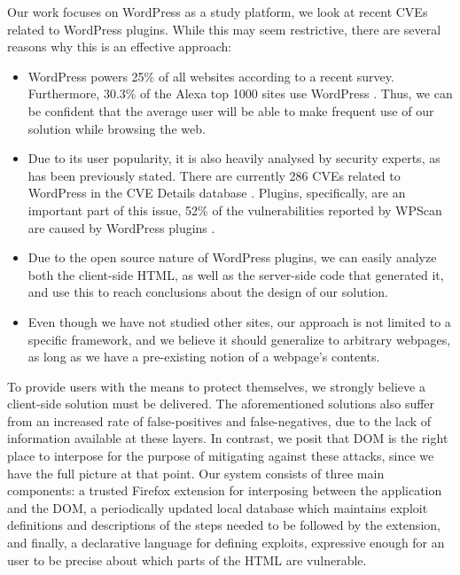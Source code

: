 Our work focuses on WordPress as a study platform, we look at recent CVEs related to WordPress plugins. While this may seem restrictive, there are several reasons why this is an effective approach:
\begin{itemize}
	\item WordPress powers 25\% of all websites according to a recent survey. Furthermore, 30.3\% of the Alexa top 1000 sites use WordPress \cite{w3techs}. Thus, we can be confident that the average user will be able to make frequent use of our solution while browsing the web.
	\item Due to its user popularity, it is also heavily analysed by security experts, as has been previously stated. There are currently 286 CVEs related to WordPress in the CVE Details database \cite{cvedetails}. Plugins, specifically, are an important part of this issue, 52\% of the vulnerabilities reported by WPScan are caused by WordPress plugins \cite{wpscan}.
	\item Due to the open source nature of WordPress plugins, we can easily analyze both the client-side HTML, as well as the server-side code that generated it, and use this to reach conclusions about the design of our solution.
	\item Even though we have not studied other sites, our approach is not limited to a specific framework, and we believe it should generalize to arbitrary webpages, as long as we have a pre-existing notion of a webpage's contents.
	
\end{itemize}

To provide users with the means to protect themselves, we strongly believe a client-side solution must be delivered. The aforementioned solutions also suffer from an increased rate of false-positives and false-negatives, due to the lack of information available at these layers. In contrast, we posit that DOM is the right place to interpose for the purpose of mitigating against these attacks, since we have the full picture at that point. Our system consists of three main components: a trusted Firefox extension for interposing between the application and the DOM, a periodically updated local database which maintains exploit definitions and descriptions of the steps needed to be followed by the extension, and finally, a declarative language for defining exploits, expressive enough for an user to be precise about which parts of the HTML are vulnerable. 


